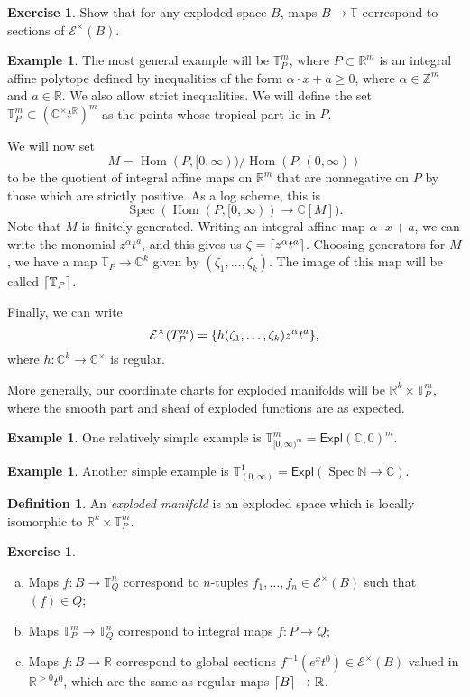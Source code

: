 \documentclass[leqno, openany]{memoir}
\DeclarePairedDelimiter{\ceil}{\lceil}{\rceil}
\theoremstyle{definition}
\newtheorem{defn}[thm]{Definition}
\newtheorem{exm}[thm]{Example}
\newtheorem{exer}[thm]{Exercise}
\theoremstyle{remark}
\theoremstyle{plain}
\theoremstyle{definition}
\theoremstyle{remark}
\newcommand{\N}{\mathbb{N}}
\newcommand{\R}{\mathbb{R}}
\newcommand{\C}{\mathbb{C}}
\newcommand{\Z}{\mathbb{Z}}
\newcommand{\mc}[1]{\mathcal{#1}}
\newcommand{\T}{\mathbb{T}}
\newcommand{\ms}[1]{\mathsf{#1}}
\newcommand{\ul}[1]{\underline{#1}}
\DeclareMathOperator{\Hom}{Hom}
\DeclareMathOperator{\Spec}{Spec}
\begin{document}
\begin{exer}
Show that for any exploded space $B$, maps $B \to \T$ correspond to sections of $\mc{E}^{\times}(B)$.
\end{exer}

\begin{exm}
  The most general example will be $\mathbb{T}^m_P$, where $P \subset \R^m$ is an integral affine polytope defined by inequalities of the form $\alpha \cdot x + a \geq 0$, where $\alpha \in \Z^m$ and $a \in \R$. We also allow strict inequalities. We will define the set $\mathbb{T}^m_P \subset (\C^{\times}t^{\R})^m$ as the points whose tropical part lie in $P$.

  We will now set 
  \[ M = \Hom(P, [0, \infty))/ \Hom(P, (0, \infty)) \]
  to be the quotient of integral affine maps on $\R^m$ that are nonnegative on $P$ by those which are strictly positive. As a log scheme, this is
  \[ \Spec(\Hom(P, [0, \infty)) \to \C[M]). \]
  Note that $M$ is finitely generated. Writing an integral affine map $\alpha \cdot x + a$, we can write the monomial $z^{\alpha}t^a$, and this gives us $\zeta = \ceil{z^{\alpha}t^a}$. Choosing generators for $M$, we have a map $\mathbb{T}_P \to \C^k$ given by $(\zeta_1, \ldots, \zeta_k)$. The image of this map will be called $\ceil{\mathbb{T}_P}$.

  Finally, we can write
  \[ \mc{E}^{\times}(T^m_P) = \qty{h(\zeta_1, \ldots, \zeta_k)z^{\alpha}t^a}, \]
  where $h \colon \C^k \to \C^{\times}$ is regular.
\end{exm}

More generally, our coordinate charts for exploded manifolds will be $\R^k \times \mathbb{T}_P^m$, where the smooth part and sheaf of exploded functions are as expected.

\begin{exm}
  One relatively simple example is $\T^m_{[0, \infty)^m} = \ms{Expl}(\C, 0)^m$.
\end{exm}

\begin{exm}
Another simple example is $\T^1_{(0, \infty)} = \ms{Expl}(\Spec \N \to \C)$.
\end{exm}

\begin{defn}
An \textit{exploded manifold} is an exploded space which is locally isomorphic to $\R^k \times \mathbb{T}_P^m$.
\end{defn}

\begin{exer}\leavevmode
  \begin{enumerate}[(a)]
  \item Maps $f \colon B \to \T_Q^n$ correspond to $n$-tuples $f_1, \ldots, f_n \in \mc{E}^{\times}(B)$ such that $(\ul{f}) \in Q$;
  \item Maps $\T_P^m \to \T_Q^n$ correspond to integral maps $f \colon P \to Q$;
    \item Maps $f \colon B \to \R$ correspond to global sections $f^{-1}(e^xt^0) \in \mc{E}^{\times}(B)$ valued in $\R^{>0}t^0$, which are the same as regular maps $\ceil{B} \to \R$.
  \end{enumerate}
\end{exer}
\end{document}
